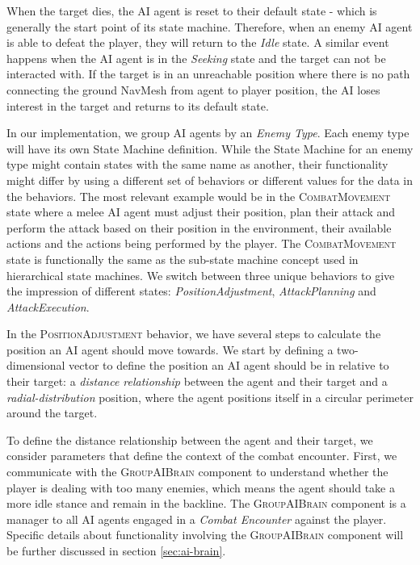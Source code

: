 When the target dies, the AI agent is reset to their default state - which is generally the start point of its state machine. Therefore, when an enemy AI agent is able to defeat the player, they will return to the \emph{Idle} state. A similar event happens when the AI agent is in the \emph{Seeking} state and the target can not be interacted with. If the target is in an unreachable position where there is no path connecting the ground NavMesh from agent to player position, the AI loses interest in the target and returns to its default state.

In our implementation, we group AI agents by an \emph{Enemy Type}. Each enemy type will have its own State Machine definition. While the State Machine for an enemy type might contain states with the same name as another, their functionality might differ by using a different set of behaviors or different values for the data in the behaviors. The most relevant example would be in the \textsc{CombatMovement} state where a melee AI agent must adjust their position, plan their attack and perform the attack based on their position in the environment, their available actions and the actions being performed by the player. The \textsc{CombatMovement} state is functionally the same as the sub-state machine concept used in hierarchical state machines. We switch between three unique behaviors to give the impression of different states: \emph{PositionAdjustment}, \emph{AttackPlanning} and \emph{AttackExecution}.

 In the \textsc{PositionAdjustment} behavior, we have several steps to calculate the position an AI agent should move towards. We start by defining a two-dimensional vector to define the position an AI agent should be in relative to their target: a \emph{distance relationship} between the agent and their target and a \emph{radial-distribution} position, where the agent positions itself in a circular perimeter around the target.

To define the distance relationship between the agent and their target, we consider parameters that define the context of the combat encounter. First, we communicate with the \textsc{GroupAIBrain} component to understand whether the player is dealing with too many enemies, which means the agent should take a more idle stance and remain in the backline. The \textsc{GroupAIBrain} component is a manager to all AI agents engaged in a \emph{Combat Encounter} against the player. Specific details about functionality involving the \textsc{GroupAIBrain} component will be further discussed in section \ref{sec:ai-brain}.

